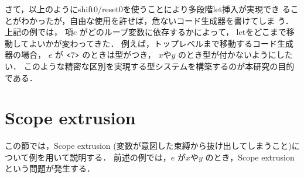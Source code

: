%
%
%
%
%

さて，以上のようにshift0/reset0を使うことにより多段階let挿入が実現でき
ることがわかったが，自由な使用を許せば，危ないコード生成器を書けてしま
う．上記の例では，
項$e$ がどのループ変数に依存するかによって，
letをどこまで移動してよいかが変わってきた．
例えば，トップレベルまで移動するコード生成器の場合，
$e$ が $\texttt{<}{7}\texttt{>}$ のときは型がつき，
$x$や$y$ のとき型が付かないようにしたい．
このような精密な区別を実現する型システムを構築するのが本研究の目的である．

\section{Scope extrusion}
この節では，Scope extrusion (変数が意図した束縛から抜け出してしまうこと)について例を用いて説明する．
前述の例では，$e$ が$x$や$y$ のとき，Scope extrusion という問題が発生する．


